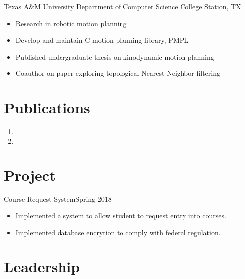\documentclass[11pt,a4paper,sans]{moderncv}
\newcommand{\Rplus}{\protect\hspace{-.1em}\protect\raisebox{.35ex}{\smaller{\smaller\textbf{+}}}}
\newcommand{\Cpp}{\mbox{C\Rplus\Rplus}\xspace}
\newcommand{\spacing}{2pt}
\begin{document}
\vspace{\spacing}

  {Texas A\&M University Department of Computer Science}
    {College Station, TX}{}{\vspace{3pt}
    \begin{itemize}
      \setlength{\itemindent}{1em}
      \item Research in robotic motion planning
      \item Develop and maintain \Cpp motion planning library, PMPL
      \item Published undergraduate thesis on kinodynamic motion planning
      \item Coauthor on paper exploring topological Nearest-Neighbor filtering
    \end{itemize}
}

\vspace{\spacing}

%
\section*{Publications}
\begin{enumerate}
    \item {}
    \item {}
\end{enumerate}

\section{Project}

  {Course Request System}{Spring 2018}
    {}{\vspace{3pt}
    \begin{itemize}
      \setlength{\itemindent}{1em}
      \item Implemented a system to allow student to request entry into courses.
      \item Implemented database encrytion to comply with federal regulation.
    \end{itemize}
}

\section{Leadership}
\vspace{\spacing}

\vspace{-1em}


%
%
%
%
\end{document}
